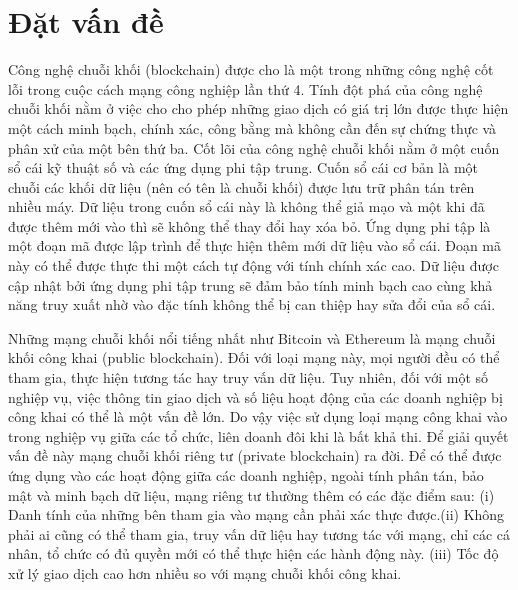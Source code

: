 \documentclass[../DoAn.tex]{subfiles}
\begin{document}
\section{Đặt vấn đề}
\label{section:1.1}
Công nghệ chuỗi khối (blockchain) được cho là một trong những công nghệ cốt lỗi trong cuộc cách mạng công nghiệp lần thứ 4. Tính đột phá của công nghệ chuỗi khối nằm ở việc cho cho phép những giao dịch có giá trị lớn được thực hiện một cách minh bạch, chính xác, công bằng mà không cần đến sự chứng thực và phân xử của một bên thứ ba. Cốt lõi của công nghệ chuỗi khối nằm ở một cuốn sổ cái kỹ thuật số và các ứng dụng phi tập trung. Cuốn sổ cái cơ bản là một chuỗi các khối dữ liệu (nên có tên là chuỗi khối) được lưu trữ phân tán trên nhiều máy. Dữ liệu trong cuốn sổ cái này là không thể giả mạo và một khi đã được thêm mới vào thì sẽ không thể thay đổi hay xóa bỏ. Ứng dụng phi tập là một đoạn mã được lập trình để thực hiện thêm mới dữ liệu vào sổ cái. Đoạn mã này có thể được thực thi một cách tự động với tính chính xác cao. Dữ liệu được cập nhật bởi ứng dụng phi tập trung sẽ đảm bảo tính minh bạch cao cùng khả năng truy xuất nhờ vào đặc tính không thể bị can thiệp hay sửa đổi của sổ cái.

Những mạng chuỗi khối nổi tiếng nhất như Bitcoin và Ethereum là mạng chuỗi khối công khai (public blockchain). Đối với loại mạng này, mọi người đều có thể tham gia, thực hiện tương tác hay truy vấn dữ liệu. Tuy nhiên, đối với một số nghiệp vụ, việc thông tin giao dịch và số liệu hoạt động của các doanh nghiệp bị công khai có thể là một vấn đề lớn. Do vậy việc sử dụng loại mạng công khai vào trong nghiệp vụ giữa các tổ chức, liên doanh đôi khi là bất khả thi. Để giải quyết vấn đề này mạng chuỗi khối riêng tư (private blockchain) ra đời. Để có thể được ứng dụng vào các hoạt động giữa các doanh nghiệp, ngoài tính phân tán, bảo mật và minh bạch dữ liệu, mạng riêng tư thường thêm có các đặc điểm sau: (i) Danh tính của những bên tham gia vào mạng cần phải xác thực được.(ii) Không phải ai cũng có thể tham gia, truy vấn dữ liệu hay tương tác với mạng, chỉ các cá nhân, tổ chức có đủ quyền mới có thể thực hiện các hành động này. (iii) Tốc độ xử lý giao dịch cao hơn nhiều so với mạng chuỗi khối công khai.
\end{document}
